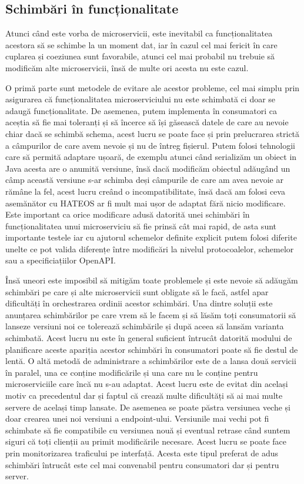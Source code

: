 \subsection{Schimbări în funcționalitate}

Atunci când este vorba de microservicii, este inevitabil ca funcționalitatea acestora să
se schimbe la un moment dat, iar în cazul cel mai fericit în care cuplarea și coeziunea sunt favorabile,
atunci cel mai probabil nu trebuie să modificăm alte microservicii, însă de multe ori acesta nu este
cazul.

O primă parte sunt metodele de evitare ale acestor probleme, cel mai simplu prin asigurarea
că funcționalitatea microserviciului nu este schimbată ci doar se adaugă funcționalitate. De asemenea,
putem implementa în consumatori ca aceștia să fie mai toleranți și să încerce să își găsească 
datele de care au nevoie chiar dacă se schimbă schema, acest lucru se poate face și prin prelucrarea
strictă a câmpurilor de care avem nevoie și nu de întreg fișierul. Putem folosi tehnologii care să
permită adaptare ușoară, de exemplu atunci când serializăm un obiect in Java acesta are o anumită
versiune, însă dacă modificăm obiectul adăugând un câmp această versiune s-ar schimba deși 
câmpurile de care am avea nevoie ar rămâne la fel, acest lucru creând o incompatibilitate, însă
dacă am folosi ceva asemănător cu HATEOS ar fi mult mai ușor de adaptat fără nicio modificare.
Este important ca orice modificare adusă datorită unei schimbări în funcționalitatea unui microserviciu
să fie prinsă cât mai rapid, de asta sunt importante testele iar cu ajutorul schemelor definite 
explicit putem folosi diferite unelte ce pot valida diferențe între modificări la nivelul 
protocoalelor, schemelor sau a specificiațiilor OpenAPI.

Însă uneori este imposibil să mitigăm toate problemele și este nevoie să adăugăm schimbări pe care
și alte microservicii sunt obligate să le facă, astfel apar dificultăți în orchestrarea ordinii acestor schimbări.
Una dintre soluții este anunțarea schimbărilor pe care vrem să le facem și să lăsăm toți consumatorii 
să lanseze versiuni noi ce tolerează schimbările și după aceea să lansăm varianta schimbată.
Acest lucru nu este în general suficient întrucât datorită modului de planificare aceste 
apariția acestor schimbări în consumatori poate să fie destul de lentă. O altă metodă 
de administrare a schimbărilor este de a lansa două servicii în paralel, una ce conține 
modificările și una care nu le conține pentru microserviciile care încă nu s-au adaptat.
Acest lucru este de evitat din același motiv ca precedentul dar și faptul că crează multe 
dificultăți să ai mai multe servere de același timp lansate. De asemenea se poate păstra
versiunea veche și doar crearea unei noi versiuni a endpoint-ului. Versiunile mai vechi
pot fi schimbate să fie compatibile cu versiunea nouă și eventual retrase când suntem siguri că
toți clienții au primit modificările necesare. Acest lucru se poate face prin monitorizarea traficului
pe interfață. Acesta este tipul preferat de adus schimbări întrucât este cel mai convenabil pentru
consumatori dar și pentru server.

